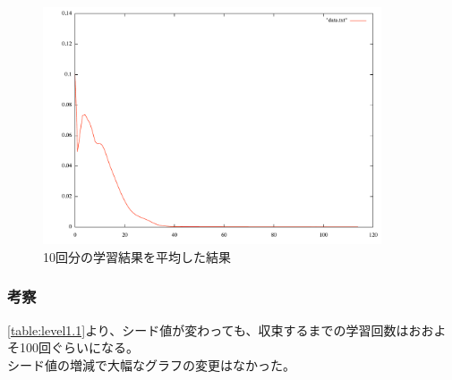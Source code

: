 \begin{figure}[h]
 \begin{center}
  \includegraphics[width=10.0cm]{figs/ex_ave.pdf}
  \caption{10回分の学習結果を平均した結果}
  \label{graph:level1.1-2}
 \end{center}
\end{figure}

\subsubsection{考察}
\ref{table:level1.1}より、シード値が変わっても、収束するまでの学習回数はおおよそ100回ぐらいになる。\\
シード値の増減で大幅なグラフの変更はなかった。

